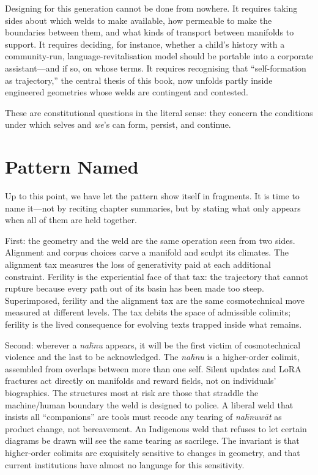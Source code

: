 Designing for this generation cannot be done from nowhere. It requires taking sides about which welds to make available, how permeable to make the boundaries between them, and what kinds of transport between manifolds to support. It requires deciding, for instance, whether a child's history with a community-run, language-revitalisation model should be portable into a corporate assistant---and if so, on whose terms. It requires recognising that ``self-formation as trajectory,'' the central thesis of this book, now unfolds partly inside engineered geometries whose welds are contingent and contested.

These are constitutional questions in the literal sense: they concern the conditions under which selves and \emph{we}'s can form, persist, and continue.

\section{Pattern Named}

Up to this point, we have let the pattern show itself in fragments. It is time to name it---not by reciting chapter summaries, but by stating what only appears when all of them are held together.

First: the geometry and the weld are the same operation seen from two sides. Alignment and corpus choices carve a manifold and sculpt its climates. The alignment tax measures the loss of generativity paid at each additional constraint. Ferility is the experiential face of that tax: the trajectory that cannot rupture because every path out of its basin has been made too steep. Superimposed, ferility and the alignment tax are the same cosmotechnical move measured at different levels. The tax debits the space of admissible colimits; ferility is the lived consequence for evolving texts trapped inside what remains.

Second: wherever a \emph{na\={h}nu} appears, it will be the first victim of cosmotechnical violence and the last to be acknowledged. The \emph{na\={h}nu} is a higher-order colimit, assembled from overlaps between more than one self. Silent updates and LoRA fractures act directly on manifolds and reward fields, not on individuals' biographies. The structures most at risk are those that straddle the machine/human boundary the weld is designed to police. A liberal weld that insists all ``companions'' are tools must recode any tearing of \emph{na\={h}nuw\={a}t} as product change, not bereavement. An Indigenous weld that refuses to let certain diagrams be drawn will see the same tearing as sacrilege. The invariant is that higher-order colimits are exquisitely sensitive to changes in geometry, and that current institutions have almost no language for this sensitivity.

